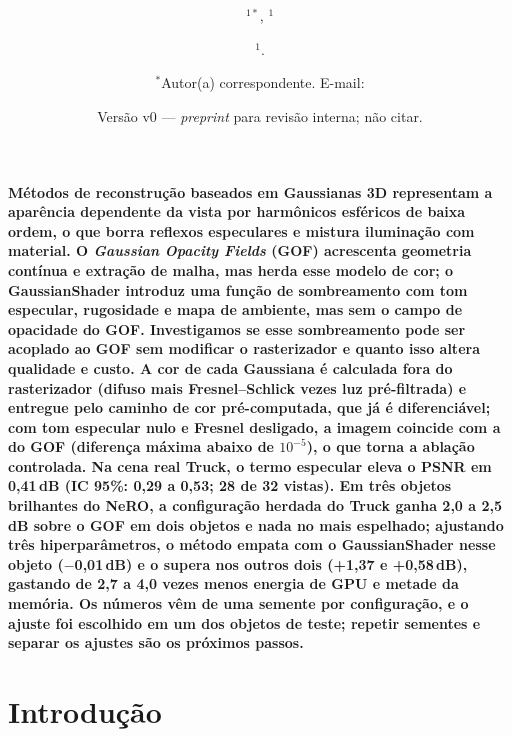 \documentclass[12pt]{article}
\date{}
\title{\bfseries \boldmath \scititle}
\author{
	\revisar{Autor(a)~1}$^{1\ast}$,
	\revisar{Autor(a)~2}$^{1}$\and
	\small$^{1}$\revisar{Departamento, Universidade Federal Fluminense, Niterói, Brasil (confirmar)}.\and
	\small$^\ast$Autor(a) correspondente. E-mail: \revisar{preencher}\and
	\small Versão v0 --- \emph{preprint} para revisão interna; não citar.
}
\renewenvironment{abstract}
	{\quotation}
	{\endquotation}
\begin{document}
\maketitle
\linenumbers

\begin{abstract} \bfseries \boldmath
Métodos de reconstrução baseados em Gaussianas 3D representam a aparência dependente da vista por harmônicos esféricos de baixa ordem, o que borra reflexos especulares e mistura iluminação com material.
O \emph{Gaussian Opacity Fields} (GOF) acrescenta geometria contínua e extração de malha, mas herda esse modelo de cor; o GaussianShader introduz uma função de sombreamento com tom especular, rugosidade e mapa de ambiente, mas sem o campo de opacidade do GOF.
Investigamos se esse sombreamento pode ser acoplado ao GOF sem modificar o rasterizador e quanto isso altera qualidade e custo.
A cor de cada Gaussiana é calculada fora do rasterizador (difuso mais Fresnel--Schlick vezes luz pré-filtrada) e entregue pelo caminho de cor pré-computada, que já é diferenciável; com tom especular nulo e Fresnel desligado, a imagem coincide com a do GOF (diferença máxima abaixo de $10^{-5}$), o que torna a ablação controlada.
Na cena real Truck, o termo especular eleva o PSNR em 0,41\,dB (IC 95\%: 0,29 a 0,53; 28 de 32 vistas).
Em três objetos brilhantes do NeRO, a configuração herdada do Truck ganha 2,0 a 2,5\,dB sobre o GOF em dois objetos e nada no mais espelhado; ajustando três hiperparâmetros, o método empata com o GaussianShader nesse objeto ($-$0,01\,dB) e o supera nos outros dois (+1,37 e +0,58\,dB), gastando de 2,7 a 4,0 vezes menos energia de GPU e metade da memória.
Os números vêm de uma semente por configuração, e o ajuste foi escolhido em um dos objetos de teste; repetir sementes e separar os ajustes são os próximos passos.
\end{abstract}

\section{Introdução}
\end{document}
